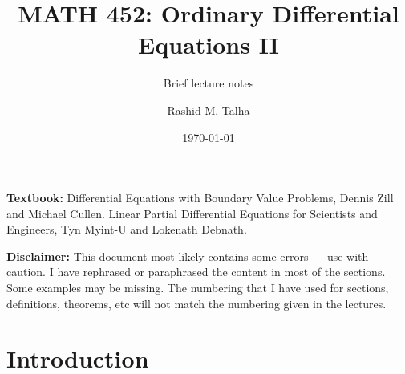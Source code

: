 \documentclass[11pt]{penrose}
\title{MATH 452: Ordinary Differential Equations II}
\subtitle{Brief lecture notes}
\author{Rashid M. Talha}
\affiliation{School of Natural Sciences, NUST}
\date{\today}
\begin{document}
\maketitle

\textbf{Textbook:} Differential Equations with Boundary Value Problems, Dennis Zill and Michael Cullen. Linear Partial Differential Equations for Scientists and Engineers, Tyn Myint-U and Lokenath Debnath.

\textbf{Disclaimer:} This document most likely contains some errors --- use with caution. I have rephrased or paraphrased the content in most of the sections. Some examples may be missing. The numbering that I have used for sections, definitions, theorems, etc will not match the numbering given in the lectures.

\section{Introduction}



\end{document}
